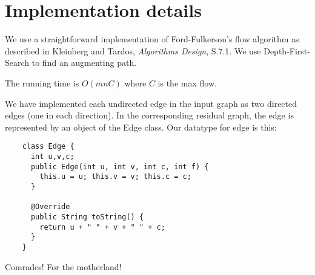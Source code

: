 \documentclass{tufte-handout}
\begin{document}
  \section{Implementation details}

  We use a straightforward implementation of Ford-Fulkerson's flow algorithm as described in Kleinberg and Tardos, \emph{Algorithms Design}, S.7.1.
  We use Depth-First-Search to find an augmenting path.

  The running time is $O(mnC)$ where $C$ is the max flow.

  We have implemented each undirected edge in the input graph as two directed edges (one in each direction).
  In the corresponding residual graph, the edge is represented by an object of the Edge class.
  Our datatype for edge is this:
  \begin{verbatim}
    class Edge {
      int u,v,c;
      public Edge(int u, int v, int c, int f) {
        this.u = u; this.v = v; this.c = c;
      }

      @Override
      public String toString() {
        return u + " " + v + " " + c;
      }
    }
  \end{verbatim}

  Comrades! For the motherland!
\end{document}
